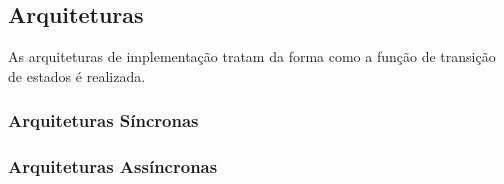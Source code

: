 \subsection{Arquiteturas}

As arquiteturas de implementação tratam da forma como a função de transição de estados é realizada.

\subsubsection{Arquiteturas Síncronas}




\subsubsection{Arquiteturas Assíncronas}
